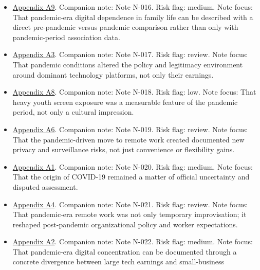 \documentclass[
  american,
  11pt,
  letterpaper,
]{article}
\providecommand{\tightlist}{%
  \setlength{\itemsep}{0pt}\setlength{\parskip}{0pt}}
\begin{document}
\begin{itemize}
\tightlist
\item
  \hyperref[appendix-a9-kids-screen-time-up-50-during-pandemic]{Appendix
  A9}. Companion note: Note N-016. Risk flag: medium. Note focus: That
  pandemic-era digital dependence in family life can be described with a
  direct pre-pandemic versus pandemic comparison rather than only with
  pandemic-period association data.
\item
  \hyperref[appendix-a3-pandemic-provides-a-techlash-reprieve]{Appendix
  A3}. Companion note: Note N-017. Risk flag: review. Note focus: That
  pandemic conditions altered the policy and legitimacy environment
  around dominant technology platforms, not only their earnings.
\item
  \hyperref[appendix-a8-excessive-screen-time-is-associated-with-mental-health-problems-and-adhd-in-us-children-and-adolescents-physical-activity-and-sleep-as-parallel-mediators]{Appendix
  A8}. Companion note: Note N-018. Risk flag: low. Note focus: That
  heavy youth screen exposure was a measurable feature of the pandemic
  period, not only a cultural impression.
\item
  \hyperref[appendix-a6-remote-working-pre-and-post-covid-19-an-analysis-of-new-threats-and-risks-to-security-and-privacy]{Appendix
  A6}. Companion note: Note N-019. Risk flag: review. Note focus: That
  the pandemic-driven move to remote work created documented new privacy
  and surveillance risks, not just convenience or flexibility gains.
\item
  \hyperref[appendix-a1-report-on-potential-links-between-the-wuhan-institute-of-virology-and-the-origins-of-covid-19]{Appendix
  A1}. Companion note: Note N-020. Risk flag: medium. Note focus: That
  the origin of COVID-19 remained a matter of official uncertainty and
  disputed assessment.
\item
  \hyperref[appendix-a4-work-from-home-is-here-to-stay-call-for-flexibility-in-post-pandemic-work-policies]{Appendix
  A4}. Companion note: Note N-021. Risk flag: review. Note focus: That
  pandemic-era remote work was not only temporary improvisation; it
  reshaped post-pandemic organizational policy and worker expectations.
\item
  \hyperref[appendix-a2-big-tech-announces-striking-pandemic-gains-as-small-businesses-strain-to-find-their-footing]{Appendix
  A2}. Companion note: Note N-022. Risk flag: medium. Note focus: That
  pandemic-era digital concentration can be documented through a
  concrete divergence between large tech earnings and small-business

\end{itemize}
\end{document}

